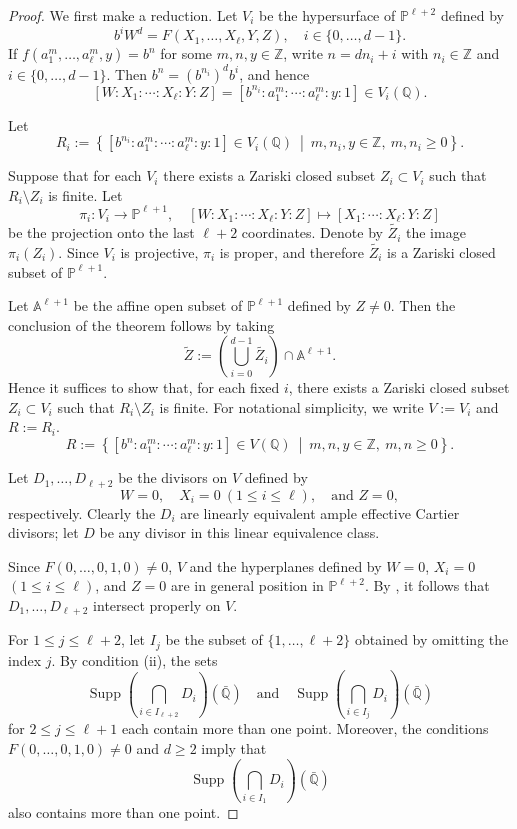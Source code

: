 \documentclass[10pt]{amsart}
\numberwithin{equation}{section}
\theoremstyle{plain}
\theoremstyle{definition}
\DeclareMathOperator{\Supp}{Supp}
\begin{document}
\begin{proof}
We first make a reduction.
Let $V_i$ be the hypersurface of $\mathbb{P}^{\ell+2}$ defined by
\[
b^iW^d = F(X_1,\ldots,X_{\ell},Y,Z),  \quad i\in \{0,\ldots, d-1\}.
\]
If $f(a_1^{m},\ldots, a_{\ell}^{m},y)=b^n$ for some $m,n,y \in \mathbb{Z}$, write
$n=dn_i+i$ with $n_i\in\mathbb{Z}$ and $i\in \{0,\ldots, d-1\}$. Then
$b^n=(b^{n_i})^d b^i$, and hence
\[
[W:X_1:\cdots:X_{\ell}:Y:Z]
=
[b^{n_i}:a_1^{m}:\cdots:a_{\ell}^{m}:y:1]
\in V_i(\mathbb{Q}).
\]

Let
\[
R_i
:=
\left\{
[b^{n_i}:a_1^{m}:\cdots:a_{\ell}^{m}:y:1]
\in V_i(\mathbb{Q})
\ \middle|\
m,n_i,y\in\mathbb{Z},\ m,n_i\ge 0
\right\}.
\]

Suppose that for each $V_i$ there exists a Zariski closed subset $Z_i \subset V_i$
such that $R_i \setminus Z_i$ is finite.
Let
\[
\pi_i : V_i \longrightarrow \mathbb{P}^{\ell+1},
\quad
[W:X_1:\cdots:X_{\ell}:Y:Z]
\longmapsto
[X_1:\cdots:X_{\ell}:Y:Z]
\]
be the projection onto the last $\ell+2$ coordinates.
Denote by $\widetilde{Z_i}$ the image $\pi_i(Z_i)$.
Since $V_i$ is projective, $\pi_i$ is proper, and therefore $\widetilde{Z_i}$ is a
Zariski closed subset of $\mathbb{P}^{\ell+1}$.

Let $\mathbb{A}^{\ell+1}$ be the affine open subset of $\mathbb{P}^{\ell+1}$ defined by $Z\neq 0$.
Then the conclusion of the theorem follows by taking
\[
\tilde Z:=\left(\bigcup_{i=0}^{d-1} \widetilde{Z_i}\right)\cap \mathbb{A}^{\ell+1}.
\]
Hence it suffices to show that, for each fixed $i$,  there exists a Zariski closed subset $Z_i \subset V_i$
such that $R_i \setminus Z_i$ is finite.
For notational simplicity, we write $V:=V_i$ and $R:=R_i$.
\[
R 
:=
\left\{
[b^{n}:a_1^{m}:\cdots:a_{\ell}^{m}:y:1]
\in V(\mathbb{Q})
\ \middle|\
m,n,y\in\mathbb{Z},\ m,n\ge 0
\right\}.
\]

 
 Let $D_1,\ldots,D_{\ell+2}$ be the divisors on $V$ defined by
\[
W=0,\quad X_i=0 \ (1\le i\le \ell), \quad \text{and } Z=0,
\]
respectively. Clearly the $D_i$ are linearly equivalent ample effective Cartier divisors; let $D$ be any divisor in this linear equivalence class. 

Since $F(0,\ldots,0,1,0) \neq 0$,  $V$ and  the hyperplanes defined by $W=0$, $X_i=0$ $(1\le i\le \ell)$, and $Z=0$ are in general position   in $\mathbb{P}^{\ell+2}$. By \cite[Remark 2.13]{HLX}, it follows that $D_1,\ldots,D_{\ell+2}$ intersect properly on $V$.

For $1\le j\le \ell+2$, let $I_j$ be the subset of $\{1,\ldots,\ell+2\}$ obtained by omitting the index $j$. By condition (ii), the sets 
\[
\Supp\!\left(\bigcap_{i\in I_{\ell+2}} D_i\right)(\bar{\mathbb{Q}})
\quad\text{and}\quad
\Supp\!\left(\bigcap_{i\in I_j} D_i\right)(\bar{\mathbb{Q}})
\]
for $2\le j\le \ell+1$ each contain more than one point. Moreover, the conditions $F(0,\ldots,0,1,0)\neq 0$ and $d\ge 2$ imply that 
\[
\Supp\!\left(\bigcap_{i\in I_1} D_i\right)(\bar{\mathbb{Q}})
\]
also contains more than one point.


\end{proof}
\end{document}

